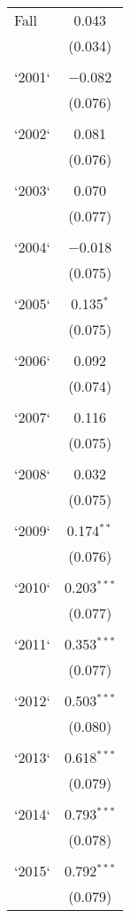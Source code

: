 \begin{table}[!htbp]
\begin{tabular}{@{\extracolsep{5pt}}lc}
 Fall & 0.043 \\ 
  & (0.034) \\ 
  & \\ 
 `2001` & $-$0.082 \\ 
  & (0.076) \\ 
  & \\ 
 `2002` & 0.081 \\ 
  & (0.076) \\ 
  & \\ 
 `2003` & 0.070 \\ 
  & (0.077) \\ 
  & \\ 
 `2004` & $-$0.018 \\ 
  & (0.075) \\ 
  & \\ 
 `2005` & 0.135$^{*}$ \\ 
  & (0.075) \\ 
  & \\ 
 `2006` & 0.092 \\ 
  & (0.074) \\ 
  & \\ 
 `2007` & 0.116 \\ 
  & (0.075) \\ 
  & \\ 
 `2008` & 0.032 \\ 
  & (0.075) \\ 
  & \\ 
 `2009` & 0.174$^{**}$ \\ 
  & (0.076) \\ 
  & \\ 
 `2010` & 0.203$^{***}$ \\ 
  & (0.077) \\ 
  & \\ 
 `2011` & 0.353$^{***}$ \\ 
  & (0.077) \\ 
  & \\ 
 `2012` & 0.503$^{***}$ \\ 
  & (0.080) \\ 
  & \\ 
 `2013` & 0.618$^{***}$ \\ 
  & (0.079) \\ 
  & \\ 
 `2014` & 0.793$^{***}$ \\ 
  & (0.078) \\ 
  & \\ 
 `2015` & 0.792$^{***}$ \\ 
  & (0.079) \\ 

\end{tabular}
\end{table}
